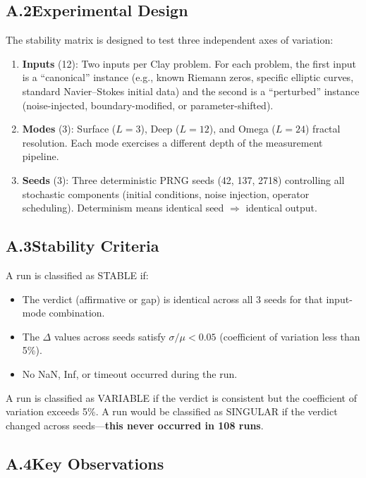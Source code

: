 \documentclass[12pt, openany]{book}
\theoremstyle{remark}
\begin{document}
\subsection*{A.2\quad Experimental Design}

The stability matrix is designed to test three independent axes of variation:

\begin{enumerate}
  \item \textbf{Inputs} (12): Two inputs per Clay problem. For each problem, the
        first input is a ``canonical'' instance (e.g., known Riemann zeros, specific
        elliptic curves, standard Navier--Stokes initial data) and the second is a
        ``perturbed'' instance (noise-injected, boundary-modified, or parameter-shifted).
  \item \textbf{Modes} (3): Surface ($L = 3$), Deep ($L = 12$), and Omega ($L = 24$)
        fractal resolution. Each mode exercises a different depth of the measurement
        pipeline.
  \item \textbf{Seeds} (3): Three deterministic PRNG seeds (42, 137, 2718) controlling
        all stochastic components (initial conditions, noise injection, operator
        scheduling). Determinism means identical seed $\Rightarrow$ identical output.
\end{enumerate}

\subsection*{A.3\quad Stability Criteria}

A run is classified as STABLE if:
\begin{itemize}
  \item The verdict (affirmative or gap) is identical across all 3 seeds for that
        input-mode combination.
  \item The $\Delta$ values across seeds satisfy $\sigma / \mu < 0.05$ (coefficient
        of variation less than 5\%).
  \item No NaN, Inf, or timeout occurred during the run.
\end{itemize}

\noindent
A run is classified as VARIABLE if the verdict is consistent but the coefficient
of variation exceeds 5\%. A run would be classified as SINGULAR if the verdict
changed across seeds---\textbf{this never occurred in 108 runs}.

\subsection*{A.4\quad Key Observations}
\end{document}
